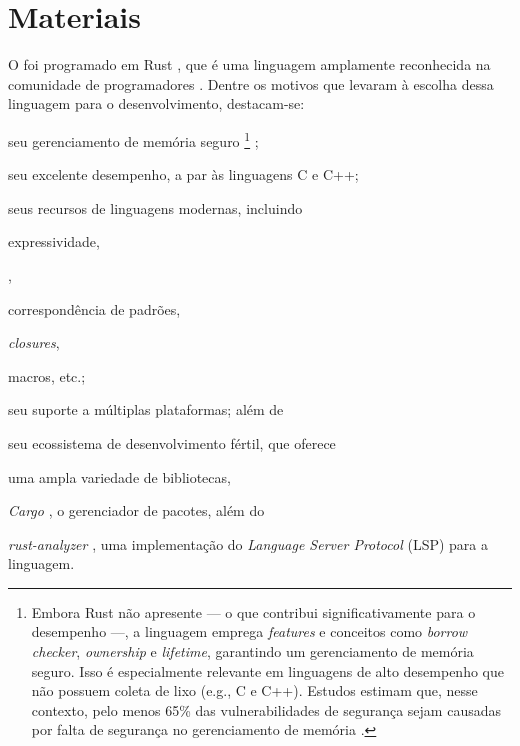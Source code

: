 \documentclass
  [11pt,a4paper,english,brazil,openright,sumario=tradicional,twoside]
  {abntex2}
\begin{document}

  \section{Materiais}

  O \witchcooking foi programado em Rust \cite{rust-2023-rust}, que é uma
  linguagem amplamente reconhecida na comunidade de programadores
  \cite{stack-overflow-2023-stack}. Dentre os motivos que levaram à escolha
  dessa linguagem para o desenvolvimento, destacam-se:
  \begin{inparaenum}
    \item seu gerenciamento de memória seguro%
          \footnote
            { Embora Rust não apresente \textit{} ---
              o que contribui significativamente para o desempenho ---, a
              linguagem emprega \textit{features} e conceitos como
              \textit{borrow checker}, \textit{ownership} e \textit{lifetime},
              garantindo um gerenciamento de memória seguro. Isso é
              especialmente relevante em linguagens de alto desempenho que não
              possuem coleta de lixo (e.g., C e C++). Estudos estimam que,
              nesse contexto, pelo menos 65\% das vulnerabilidades de segurança
              sejam causadas por falta de segurança no gerenciamento de memória
              \cite{gaynor-2020-what}.}
          \cite[3]{nsa-2022-software};
    \item seu excelente desempenho, a par às linguagens C e C++;
    \item seus recursos de linguagens modernas, incluindo
          \begin{inparaenum}
            \item expressividade,
            \item \textit{},
            \item correspondência de padrões,
            \item \textit{closures},
            \item macros, etc.;
          \end{inparaenum}
    \item seu suporte a múltiplas plataformas; além de
    \item seu ecossistema de desenvolvimento fértil, que oferece
          \begin{inparaenum}
            \item uma ampla variedade de bibliotecas,
            \item \textit{Cargo} \cite{rust-2023-cargo}, o gerenciador de
                  pacotes, além do
            \item \textit{rust-analyzer} \cite{rust-analyzer-2023-rust}, uma
                  implementação do \textit{Language Server Protocol} (LSP) para
                  a linguagem.
          \end{inparaenum}
  \end{inparaenum}
\end{document}
